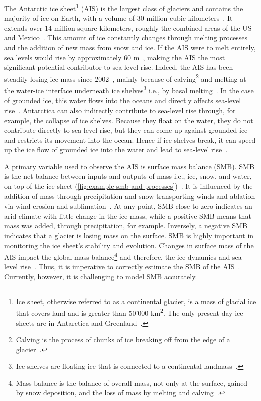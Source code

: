 \documentclass[a4paper,11pt,oneside]{report}
\begin{document}
    The Antarctic ice sheet\footnote{Ice sheet, otherwise referred to as a continental glacier, is a mass of glacial ice that covers land and is greater than 50'000 \si{km^2}. The only present-day ice sheets are in Antarctica and Greenland~\cite{Icesheet}.} (AIS) is the largest class of glaciers and contains the majority of ice on Earth, with a volume of 30 million cubic kilometers~\cite{Icesheetsquick}. It extends over 14 million square kilometers, roughly the combined areas of the US and Mexico~\cite{AntarcticIceSheet}. This amount of ice constantly changes through melting processes and the addition of new mass from snow and ice. If the AIS were to melt entirely, sea levels would rise by approximately 60 \si{m}~\cite{Kittel, Fretwell, Morlighem}, making the AIS the most significant potential contributor to sea-level rise. Indeed, the AIS has been steadily losing ice mass since 2002~\cite{Shepherd, Mottram}, mainly because of calving\footnote{Calving is the process of chunks of ice breaking off from the edge of a glacier~\cite{Marshak}.} and melting at the water-ice interface underneath ice shelves\footnote{Ice shelves are floating ice that is connected to a continental landmass~\cite{iceshelvescollapse}.} i.e., by basal melting~\cite{Kittel, Mottram, Rignot}. In the case of grounded ice, this water flows into the oceans and directly affects sea-level rise~\cite{icesheet}. Antarctica can also indirectly contribute to sea-level rise through, for example, the collapse of ice shelves. Because they float on the water, they do not contribute directly to sea level rise, but they can come up against grounded ice and restricts its movement into the ocean. Hence if ice shelves break, it can speed up the ice flow of grounded ice into the water and lead to sea-level rise~\cite{Hartley2020, iceshelvescollapse}.  
    
    
    A primary variable used to observe the AIS is surface mass balance (SMB). SMB is the net balance between inputs and outputs of mass i.e., ice, snow, and water, on top of the ice sheet (\autoref{fig:example-smb-and-processes})~\cite{Lenaerts2019}. It is influenced by the addition of mass through precipitation and snow‐transporting winds and ablation via wind erosion and sublimation~\cite{Kittel}. At any point, SMB close to zero indicates an arid climate with little change in the ice mass, while a positive SMB means that mass was added, through precipitation, for example. Inversely, a negative SMB indicates that a glacier is losing mass on the surface. SMB is highly important in monitoring the ice sheet's stability and evolution. Changes in surface mass of the AIS impact the global mass balance\footnote{Mass balance is the balance of overall mass, not only at the surface, gained by snow deposition, and the loss of mass by melting and calving~\cite{icesheet}.} and therefore, the ice dynamics and sea-level rise~\cite{Mottram}. Thus, it is imperative to correctly estimate the SMB of the AIS~\cite{icesheet}. Currently, however, it is challenging to model SMB accurately.  
\end{document}
